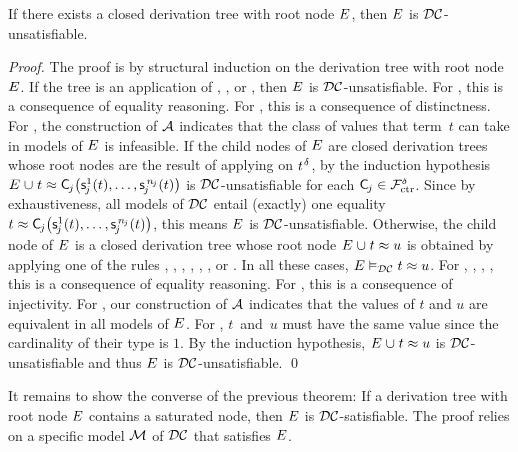 \begin{theorem}%
\label{thm:rs}%
\afterDot
If there exists a closed derivation tree with root node\/ $E$, then\/ $E$ is $\mathcal{DC}$-unsatisfiable.
\end{theorem}
\begin{proof}
The proof is by structural induction on the derivation tree with root node $E$.
If the tree is an application of , , or ,
then $E$ is $\mathcal{DC}$-unsatisfiable.
For , this is a consequence of equality reasoning.
For , this is a consequence of distinctness.
For , the construction of $\mathcal{A}$ indicates that the class of values that term~$t$ can take in models of $E$ is infeasible.
If the child nodes of $E$ are closed derivation trees
whose root nodes are the result of applying  on $t\typ{\delta}$,
by the induction hypothesis $E \mathrel\cup t \approx \smash{\textsf{C}_{\kern-0.083333em j}\bigl( \textsf{s}^1_{\kern-0.083333em j}( t ), \ldots, \textsf{s}^{\,\smash{n_{\kern-0.083333em j}}}_{\kern-0.083333em j}( t ) \bigr)}$ is
$\mathcal{DC}$-unsatisfiable
for each $\textsf{C}_{\kern-0.083333em j} \in \smash{\mathcal{F}_{\smash{\mathrm{ctr}}}^\delta}$.
Since by exhaustiveness, all models of $\mathcal{DC}$ entail (exactly) one equality $t \approx \textsf{C}_{\kern-0.083333em j}\bigl( \textsf{s}^1_{\kern-0.083333em j}( t ), \ldots, \textsf{s}^{\,\smash{n_{\kern-0.083333em j}}}_{\kern-0.083333em j}( t ) \bigr)$,
this means $E$ is $\mathcal{DC}$-unsatisfiable.
Otherwise, the child node of $E$ is a closed derivation tree
whose root node $E \mathrel\cup t \approx u$ is obtained by applying one of the rules , , , , , , or .
In all these cases, $E \vDash_{\mathcal{DC}} t \approx u$.
For , , , , this is a consequence of equality reasoning.
For , this is a consequence of injectivity.
For , our construction of $\mathcal{A}$ indicates that the values of $t$ and $u$ are equivalent in all models of $E$.
For , $t$~and~$u$ must have the same value since the cardinality of their type is $1$.
By the induction hypothesis, $E \mathrel\cup t \approx u$ is $\mathcal{DC}$-unsatisfiable
and thus $E$ is $\mathcal{DC}$-unsatisfiable.
\qed
\end{proof}

It remains to show the converse of the previous theorem: If a derivation tree
with root node $E$ contains a saturated node, then $E$ is
$\mathcal{DC}$-satisfiable.
The proof relies on a specific model $\mathcal{M}$ of $\mathcal{DC}$ that satisfies $E$.

